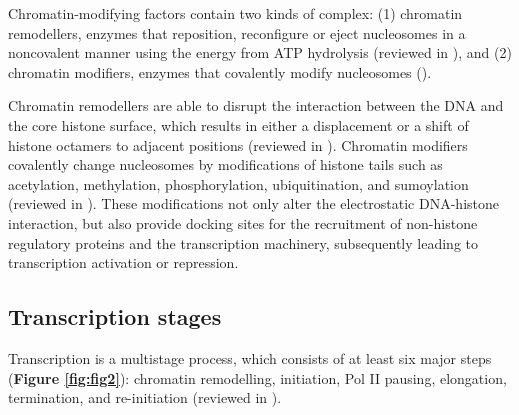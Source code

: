 Chromatin-modifying factors contain two kinds of complex: (1) chromatin remodellers, enzymes that reposition, reconfigure or eject nucleosomes in a noncovalent manner using the energy from ATP hydrolysis (reviewed in \cite{cairns2009the,becker2002atp-dependent}), and (2) chromatin modifiers, enzymes that covalently modify nucleosomes (\cite{cairns2009the,narlikar2002cooperation}).

Chromatin remodellers are able to disrupt the interaction between the DNA and the core histone surface, which results in either a displacement or a shift of histone octamers to adjacent positions (reviewed in \cite{narlikar2002cooperation}). Chromatin modifiers covalently change nucleosomes by modifications of histone tails such as acetylation, methylation, phosphorylation, ubiquitination, and sumoylation (reviewed in \cite{narlikar2002cooperation,bannister2005reversing,shilatifard2006chromatin}). These modifications not only alter the electrostatic DNA-histone interaction, but also provide docking sites for the recruitment of non-histone regulatory proteins and the transcription machinery, subsequently leading to transcription activation or repression.

\subsection{Transcription stages}

Transcription is a multistage process, which consists of at least six major steps (\textbf{Figure \ref{fig:fig2}}): chromatin remodelling, initiation, Pol II pausing, elongation, termination, and re-initiation (reviewed in \cite{fuda2009defining}).

